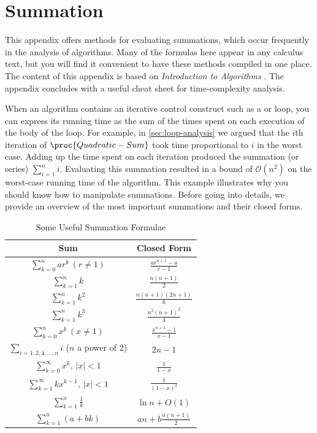 \chapter{Summation}\label{app:appendix01}

This appendix offers methods for evaluating summations, which occur frequently in the analysis of algorithms. Many
of the formulas here appear in any calculus text, but you will find it convenient to have these methods compiled in one place. The content of this appendix is based on \textit{Introduction to Algorithms} \cite{clrs4}. The appendix concludes with a useful cheat sheet for time-complexity analysis.

When an algorithm contains an iterative control construct such as a \While or \For\unskip loop, you can express its running time as the sum of the times spent on each execution of the body of the loop. For example, in \autoref{sec:loop-analysis} we argued that the $i$th iteration of $\proc{Quadratic-Sum}$ took time proportional to $i$ in the worst case. Adding up the time spent on each iteration produced the summation (or series) $\sum\limits_{i=1}^n i$. Evaluating this summation resulted in a bound of $\mathcal{O}(n^2)$ on the worst-case running time of the algorithm. This example illustrates why you should know how to manipulate summations. Before going into details, we provide an overview of the most important summations and their closed forms.

\begin{table}[htbp]
    \centering
    \renewcommand{\arraystretch}{2}
    \begin{tabular}{|c|c|}
    \hline
    \textbf{Sum} & \textbf{Closed Form} \\ \hline
    $\displaystyle \sum_{k=0}^n ar^k \, (r \neq 1)$ & $\displaystyle \frac{ar^{n+1} - a}{r - 1}$ \\ \hline
    $\displaystyle \sum_{k=1}^n k$ & $\displaystyle \frac{n(n+1)}{2}$ \\ \hline
    $\displaystyle \sum_{k=1}^n k^2$ & $\displaystyle \frac{n(n+1)(2n+1)}{6}$ \\ \hline
    $\displaystyle \sum_{k=1}^n k^3$ & $\displaystyle \frac{n^2(n+1)^2}{4}$ \\ \hline
    $\displaystyle \sum_{k=0}^n x^k \, (x \neq 1)$ & $\displaystyle \frac{x^{n+1} - 1}{x - 1}$ \\ \hline
    $\displaystyle \sum_{i=1,2,4,\ldots,n} i$ ($n$ a power of 2) & $\displaystyle 2n - 1$ \\ \hline
    $\displaystyle \sum_{k=0}^\infty x^k, \, |x| < 1$ & $\displaystyle \frac{1}{1 - x}$ \\ \hline
    $\displaystyle \sum_{k=1}^\infty kx^{k-1}, \, |x| < 1$ & $\displaystyle \frac{1}{(1 - x)^2}$ \\ \hline
    $\displaystyle \sum_{k=1}^n \frac{1}{k}$ & $\displaystyle \ln n + O(1)$ \\ \hline
    $\displaystyle \sum_{k=1}^n (a + bk)$ & $\displaystyle a n + b \frac{n(n+1)}{2}$ \\ \hline  
    \end{tabular}
    \caption{Some Useful Summation Formulae}
\end{table}



